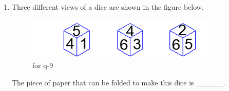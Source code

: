 \documentclass[journal,12pt,onecolumn]{IEEEtran}
\theoremstyle{remark}
\begin{document}
\begin{enumerate}
\item Three different views of a dice are shown in the figure below.
\begin{figure}[H]
    \centering
    \includegraphics[width=0.3\columnwidth]{figs/fig1.png}
    \caption{for q-9}
    \label{fig:placeholder}
\end{figure}
The piece of paper that can be folded to make this dice is \_\_\_\_\_.
\begin{enumerate}
\end{enumerate}
\end{enumerate}
\end{document}
